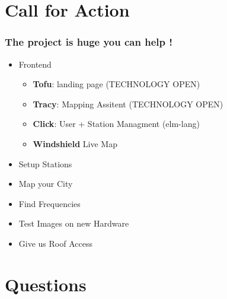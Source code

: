 \documentclass[aspectratio=169]{beamer}
\begin{document}

\section{Call for Action}


\begin{frame}
\frametitle{The project is huge you can help !}

\begin{itemize}
  \item Frontend
        \begin{itemize}
          \item \textbf{Tofu}: landing page (TECHNOLOGY OPEN)
          \item \textbf{Tracy}: Mapping Assitent (TECHNOLOGY OPEN)
          \item \textbf{Click}: User + Station Managment (elm-lang)
          \item \textbf{Windshield} Live Map
        \end{itemize}
  \item Setup Stations
  \item Map your City
  \item Find Frequencies
  \item Test Images on new Hardware
  \item Give us Roof Access
\end{itemize}

\end{frame}


\section{Questions}
\end{document}

